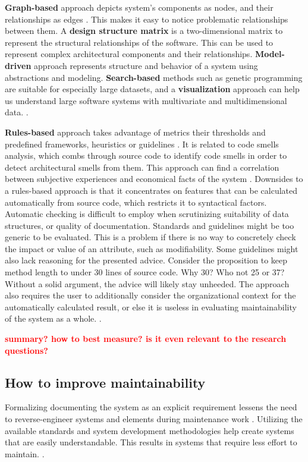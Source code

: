 \documentclass[utf8,english]{gradu3}
\newcommand{\todo}[1]{\textbf{\textcolor{red}{#1}}}
\begin{document}
\textbf{Graph-based} approach depicts system's components as nodes, and their
relationships as edges \parencite{Mumtaz2021}. This makes it easy to notice
problematic relationships between them. A \textbf{design structure matrix} is a
two-dimensional matrix to represent the structural relationships of the
software. This can be used to represent complex architectural components and
their relationships. \textbf{Model-driven} approach represents structure and behavior of
a system using abstractions and modeling. \textbf{Search-based} methods such as genetic
programming are suitable for especially large datasets, and a \textbf{visualization}
approach can help us understand large software systems with multivariate and
multidimensional data. \parencite[9-14]{Mumtaz2021}.

\textbf{Rules-based} approach takes advantage of metrics their thresholds and predefined
frameworks, heuristics or guidelines \parencite[8]{Mumtaz2021}. It is related to
code smells analysis, which combs through source code to identify code smells in
order to detect architectural smells from them. This approach can find a
correlation between subjective experiences and economical facts of the system
\parencite[22]{Broy2006}. Downsides to a rules-based approach is that it
concentrates on features that can be calculated automatically from source code,
which restricts it to syntactical factors. Automatic checking is difficult to
employ when scrutinizing suitability of data structures, or quality of
documentation. Standards and guidelines might be too generic to be evaluated.
This is a problem if there is no way to concretely check the impact or value of
an attribute, such as modifiability. Some guidelines might also lack reasoning for
the presented advice. Consider the proposition to keep method length to under 30
lines of source code. Why 30? Who not 25 or 37? Without a solid argument, the
advice will likely stay unheeded.  The approach also requires the user to
additionally consider the organizational context for the automatically
calculated result, or else it is useless in evaluating maintainability of the
system as a whole. \parencite[22]{Broy2006}.

\todo{summary? how to best measure? is it even relevant to the research questions?}

\subsection{How to improve maintainability}

Formalizing documenting the system as an explicit requirement lessens the need
to reverse-engineer systems and elements during maintenance work
\parencite[96]{IEEE12207}. Utilizing the available standards and system
development methodologies help create systems that are easily understandable.
This results in systems that require less effort to maintain.
\parencite[608]{Gorla2010}.
\end{document}

